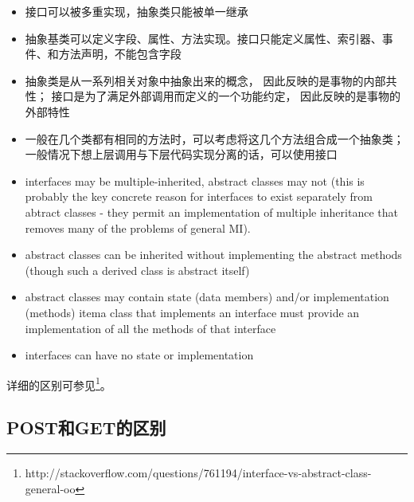 \documentclass{book}
\begin{document}
\begin{itemize}
\item{接口可以被多重实现，抽象类只能被单一继承}
\item{抽象基类可以定义字段、属性、方法实现。接口只能定义属性、索引器、事件、和方法声明，不能包含字段}
\item{抽象类是从一系列相关对象中抽象出来的概念， 因此反映的是事物的内部共性；
接口是为了满足外部调用而定义的一个功能约定， 因此反映的是事物的外部特性}
\item{一般在几个类都有相同的方法时，可以考虑将这几个方法组合成一个抽象类；
一般情况下想上层调用与下层代码实现分离的话，可以使用接口}
\item{interfaces may be multiple-inherited, abstract classes may not (this 
is probably the key concrete reason for interfaces to exist separately from 
abtract classes - they permit an implementation of multiple inheritance that 
removes many of the problems of general MI).}
\item{abstract classes can be inherited without implementing the abstract 
methods (though such a derived class is abstract itself)}
\item{abstract classes may contain state (data members) and/or implementation (methods)}
item{a class that implements an interface must provide an implementation of all the methods of that interface}
\item{interfaces can have no state or implementation}
\end{itemize}

详细的区别可参见\footnote{http://stackoverflow.com/questions/761194/interface-vs-abstract-class-general-oo}。

\subsection{POST和GET的区别}
\end{document}
